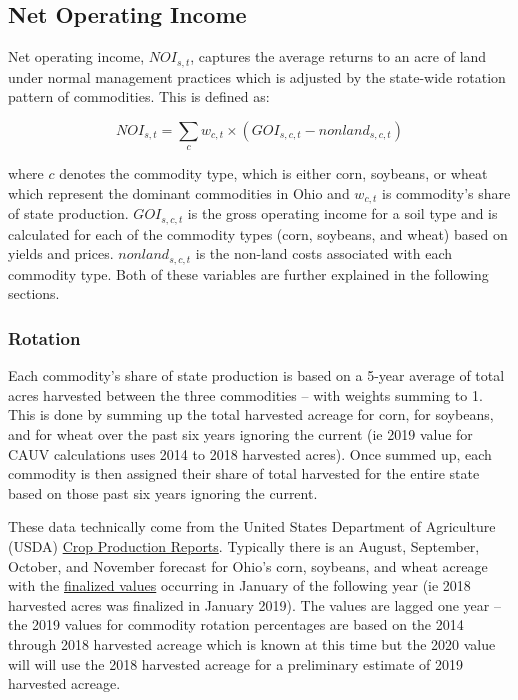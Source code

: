 \documentclass[]{article}
\begin{document}
\hypertarget{net-operating-income}{%
\subsection{Net Operating Income}\label{net-operating-income}}

Net operating income, \({NOI_{s,t}}\), captures the average returns to
an acre of land under normal management practices which is adjusted by
the state-wide rotation pattern of commodities. This is defined as:

\[
NOI_{s,t} = \sum_{c} w_{c,t}\times(GOI_{s,c,t} - {nonland}_{s,c,t})
\]

where \(c\) denotes the commodity type, which is either corn, soybeans,
or wheat which represent the dominant commodities in Ohio and
\(w_{c,t}\) is commodity's share of state production. \(GOI_{s,c,t}\) is
the gross operating income for a soil type and is calculated for each of
the commodity types (corn, soybeans, and wheat) based on yields and
prices. \({nonland}_{s,c,t}\) is the non-land costs associated with each
commodity type. Both of these variables are further explained in the
following sections.

\hypertarget{rotation}{%
\subsubsection{Rotation}\label{rotation}}

Each commodity's share of state production is based on a 5-year average
of total acres harvested between the three commodities -- with weights
summing to 1. This is done by summing up the total harvested acreage for
corn, for soybeans, and for wheat over the past six years ignoring the
current (ie 2019 value for CAUV calculations uses 2014 to 2018 harvested
acres). Once summed up, each commodity is then assigned their share of
total harvested for the entire state based on those past six years
ignoring the current.

These data technically come from the United States Department of
Agriculture (USDA)
\href{https://usda.mannlib.cornell.edu/MannUsda/viewDocumentInfo.do?documentID=1046}{Crop
Production Reports}. Typically there is an August, September, October,
and November forecast for Ohio's corn, soybeans, and wheat acreage with
the
\href{https://usda.mannlib.cornell.edu/MannUsda/viewDocumentInfo.do?documentID=1047}{finalized
values} occurring in January of the following year (ie 2018 harvested
acres was finalized in January 2019). The values are lagged one year --
the 2019 values for commodity rotation percentages are based on the 2014
through 2018 harvested acreage which is known at this time but the 2020
value will will use the 2018 harvested acreage for a preliminary
estimate of 2019 harvested acreage.
\end{document}
